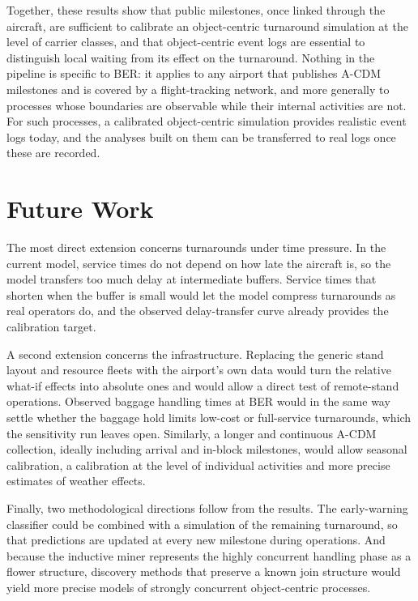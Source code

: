 Together, these results show that public milestones, once linked through the aircraft, are sufficient to calibrate an object-centric turnaround simulation at the level of carrier classes, and that object-centric event logs are essential to distinguish local waiting from its effect on the turnaround. Nothing in the pipeline is specific to BER: it applies to any airport that publishes A-CDM milestones and is covered by a flight-tracking network, and more generally to processes whose boundaries are observable while their internal activities are not. For such processes, a calibrated object-centric simulation provides realistic event logs today, and the analyses built on them can be transferred to real logs once these are recorded.

\section{Future Work}

The most direct extension concerns turnarounds under time pressure. In the current model, service times do not depend on how late the aircraft is, so the model transfers too much delay at intermediate buffers. Service times that shorten when the buffer is small would let the model compress turnarounds as real operators do, and the observed delay-transfer curve already provides the calibration target.

A second extension concerns the infrastructure. Replacing the generic stand layout and resource fleets with the airport's own data would turn the relative what-if effects into absolute ones and would allow a direct test of remote-stand operations. Observed baggage handling times at BER would in the same way settle whether the baggage hold limits low-cost or full-service turnarounds, which the sensitivity run leaves open. Similarly, a longer and continuous A-CDM collection, ideally including arrival and in-block milestones, would allow seasonal calibration, a calibration at the level of individual activities and more precise estimates of weather effects.

Finally, two methodological directions follow from the results. The early-warning classifier could be combined with a simulation of the remaining turnaround, so that predictions are updated at every new milestone during operations. And because the inductive miner represents the highly concurrent handling phase as a flower structure, discovery methods that preserve a known join structure would yield more precise models of strongly concurrent object-centric processes.
